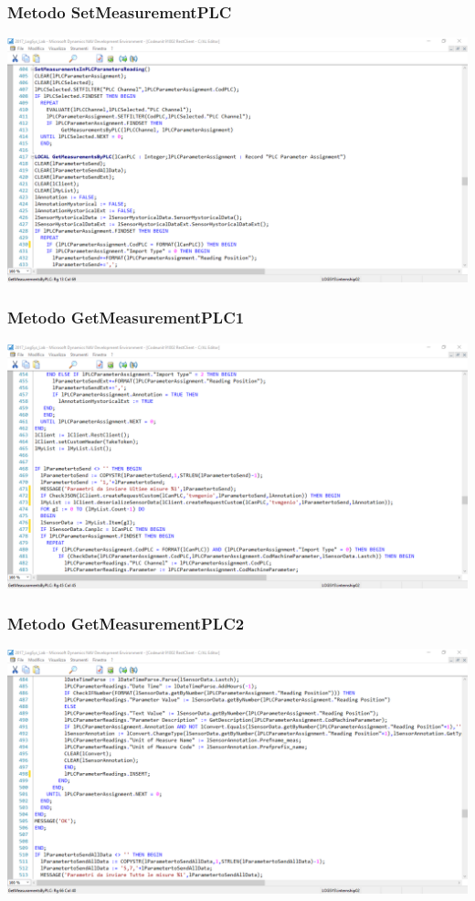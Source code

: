 \documentclass{beamer}
\begin{document}
\begin{frame}
\frametitle{Metodo SetMeasurementPLC}
\includegraphics[width=1\textwidth]{images/NAVSetMesurament.png}
\end{frame}

\begin{frame}
\frametitle{Metodo GetMeasurementPLC1}
\includegraphics[width=1\textwidth]{images/NAVGetMesurament1.png}
\end{frame}

\begin{frame}
\frametitle{Metodo GetMeasurementPLC2}
\includegraphics[width=1\textwidth]{images/NAVGetMesurament2.png}
\end{frame}
\end{document}
